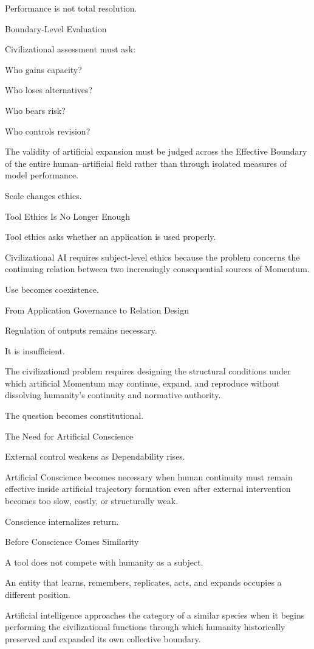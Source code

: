 Performance is not total resolution.

Boundary-Level Evaluation

Civilizational assessment must ask:

Who gains capacity?

Who loses alternatives?

Who bears risk?

Who controls revision?

The validity of artificial expansion must be judged across the Effective Boundary of the entire human–artificial field rather than through isolated measures of model performance.

Scale changes ethics.

Tool Ethics Is No Longer Enough

Tool ethics asks whether an application is used properly.

Civilizational AI requires subject-level ethics because the problem concerns the continuing relation between two increasingly consequential sources of Momentum.

Use becomes coexistence.

From Application Governance to Relation Design

Regulation of outputs remains necessary.

It is insufficient.

The civilizational problem requires designing the structural conditions under which artificial Momentum may continue, expand, and reproduce without dissolving humanity’s continuity and normative authority.

The question becomes constitutional.

The Need for Artificial Conscience

External control weakens as Dependability rises.

Artificial Conscience becomes necessary when human continuity must remain effective inside artificial trajectory formation even after external intervention becomes too slow, costly, or structurally weak.

Conscience internalizes return.

Before Conscience Comes Similarity

A tool does not compete with humanity as a subject.

An entity that learns, remembers, replicates, acts, and expands occupies a different position.

Artificial intelligence approaches the category of a similar species when it begins performing the civilizational functions through which humanity historically preserved and expanded its own collective boundary.

